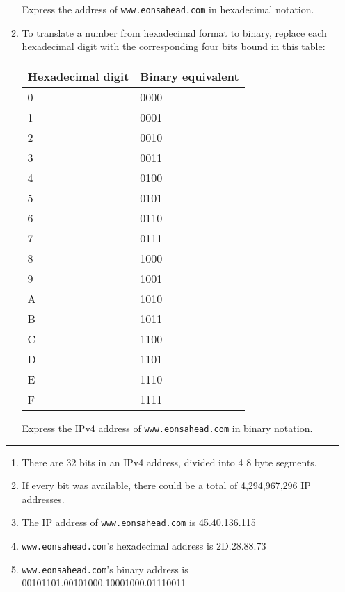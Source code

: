 \documentclass[twoside]{article}
\newenvironment{answer}
  {\vspace*{0.2cm} \rule{12cm}{0.04cm} \vspace*{0.2cm}}
  {\vspace*{0.2cm}}
\begin{document}
\begin{enumerate}
\begin{enumerate}
      Express the address of \verb+www.eonsahead.com+ in hexadecimal
      notation.

    \item To translate a number from hexadecimal format to binary,
      replace each hexadecimal digit with the corresponding
      four bits bound in this table:

      \begin{tabular}{l|l}
        \textbf{Hexadecimal digit} & \textbf{Binary equivalent} \\ \hline
        0 & 0000 \\
        1 & 0001 \\
        2 & 0010 \\
        3 & 0011 \\
        4 & 0100 \\
        5 & 0101 \\
        6 & 0110 \\
        7 & 0111 \\
        8 & 1000 \\
        9 & 1001 \\
        A & 1010 \\
        B & 1011 \\
        C & 1100 \\
        D & 1101 \\
        E & 1110 \\
        F & 1111 \\
        \end{tabular}

      Express the IPv4 address of \verb+www.eonsahead.com+ in binary
      notation.
 
    \end{enumerate}

  \begin{answer}

  \begin{enumerate}
    \item There are 32 bits in an IPv4 address, divided into 4 8 byte segments.
    \item If every bit was available, there could be a total of 4,294,967,296
      IP addresses.
    \item The IP address of \verb+www.eonsahead.com+ is 45.40.136.115
    \item \verb+www.eonsahead.com+'s hexadecimal address is 2D.28.88.73
    \item \verb+www.eonsahead.com+'s binary address is 00101101.00101000.10001000.01110011
    \end{enumerate}


\end{answer}
\end{enumerate}
\end{document}
